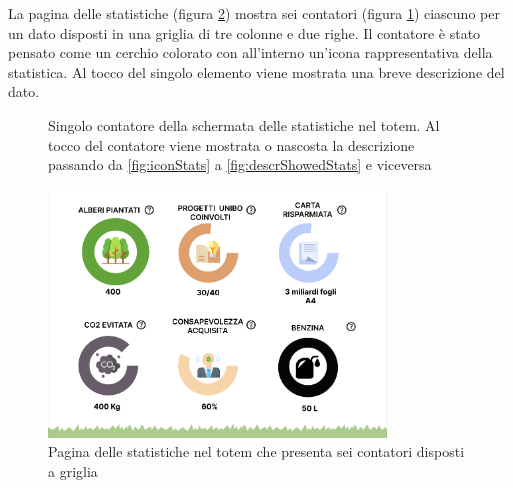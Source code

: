 La pagina delle statistiche (figura \ref{fig:statsPage}) mostra sei contatori (figura \ref{fig:statCircle}) ciascuno per un dato disposti in una griglia di tre colonne e due righe. Il contatore è stato pensato come un cerchio colorato con all'interno un'icona rappresentativa della statistica. Al tocco del singolo elemento viene mostrata una breve descrizione del dato.
\begin{figure}
    \centering
    \caption[Pagina delle statistiche nel totem]{Singolo contatore della schermata delle statistiche nel totem. Al tocco del contatore viene mostrata o nascosta la descrizione passando da \ref{fig:iconStats} a \ref{fig:descrShowedStats} e viceversa}
    \label{fig:statCircle}
\end{figure}

\begin{figure}
    \centering
    \includegraphics[width=0.8\textwidth]{img/totem/statsPage.png}
    \caption[Pagina delle statistiche nel totem]{Pagina delle statistiche nel totem che presenta sei contatori disposti a griglia}
    \label{fig:statsPage}
\end{figure}

